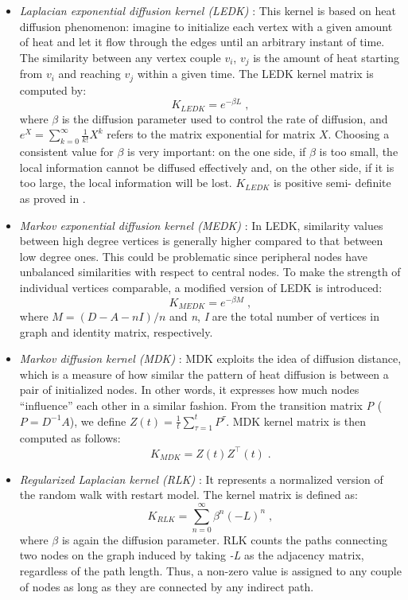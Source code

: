 \documentclass{article}
\begin{document}
\begin{itemize}
\item \textit{Laplacian exponential diffusion kernel (LEDK)} \cite{ledk}: This kernel is based on heat diffusion phenomenon: imagine to initialize each vertex with a given amount of heat and let it flow through the edges until an arbitrary instant of time. The similarity between any vertex couple $v_{i}$, $v_{j}$ is the amount of heat starting from $v_{i}$ and reaching $v_{j}$ within a given time. The LEDK kernel matrix is computed by:
\begin{equation}
K_{LEDK} = e^{-\beta L}\; ,
\end{equation}
where $\beta$ is the diffusion parameter used to control the rate of
diffusion, and $e^{X}=\sum_{k=0}^{\infty} \frac{1}{k!}X^k$ refers to the
matrix exponential for matrix $X$. Choosing a consistent value for $\beta$ is
very important: on the one side, if $\beta$ is too small, the local
information cannot be diffused effectively and, on the other side, if it is
too large, the local information will be lost. $K_{LEDK}$ is positive semi-
definite as proved in \cite{ledk}.

\item \textit{Markov exponential diffusion kernel (MEDK)} \cite{medk}: In LEDK, similarity values between high degree vertices is generally higher compared to that between low degree ones. This could be problematic since peripheral nodes have unbalanced similarities with respect to central nodes. To make the strength of individual vertices comparable, a modified version of LEDK is introduced:
\begin{equation}
K_{MEDK} = e^{-\beta M}\; ,
\end{equation}
where $M = (D-A-nI)/n$ and \textit{n}, \textit{I} are the total number of vertices in graph and identity matrix, respectively.

\item \textit{Markov diffusion kernel (MDK)} \cite{mdk}: MDK exploits the idea of diffusion distance, which is a measure of how similar the pattern of heat diffusion is between a pair of initialized nodes. In other words, it expresses how much nodes ``influence'' each other in a similar fashion. From the transition matrix \textit{P} ($P = D^{-1} A$), we define $Z(t) = \frac{1}{t}\sum_{\tau=1}^{t} P^{\tau}$. MDK kernel matrix is then computed as follows:
\begin{equation}
K_{MDK} = Z(t) Z^{\top}(t)\; .
\end{equation}

\item \textit{Regularized Laplacian kernel (RLK)} \cite{rlk}: It represents a normalized version of the random walk with restart model. The kernel matrix is defined as:
\begin{equation}
K_{RLK} = \sum_{n=0}^{\infty}\beta^{n}(-L)^n\; ,
\end{equation}
where $\beta$ is again the diffusion parameter. RLK counts the paths connecting two nodes on the graph induced by taking \textit{-L} as the adjacency matrix, regardless of the path length. Thus, a non-zero value is assigned to any couple of nodes as long as they are connected by any indirect path.
\end{itemize}
\end{document}
